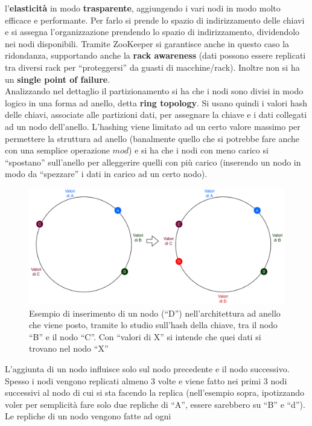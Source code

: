 \documentclass[a4paper,12pt, oneside]{book}
\begin{document}
l'\textbf{elasticità} in modo \textbf{trasparente}, aggiungendo i vari nodi in
modo molto efficace e performante. Per farlo si prende lo spazio di
indirizzamento delle chiavi e si assegna l'organizzazione prendendo lo spazio di
indirizzamento, dividendolo nei nodi disponibili. Tramite ZooKeeper si
garantisce anche in questo caso la ridondanza, supportando anche la \textbf{rack
awareness} (dati possono essere replicati tra diversi rack per ``proteggersi''
da guasti di macchine/rack). Inoltre non si ha un \textbf{single point of
  failure}.\\
Analizzando nel dettaglio il partizionamento si ha che i nodi sono divisi in
modo logico in una forma ad anello, detta \textbf{ring topology}. Si usano
quindi i valori hash delle chiavi, associate alle partizioni dati, per assegnare
la chiave e i dati collegati ad un nodo dell'anello. L'hashing viene limitato ad
un certo valore massimo per permettere la struttura ad anello (banalmente quello
che si potrebbe fare anche con una semplice operazione $mod$) e si ha che i nodi
con meno carico si ``spostano'' sull'anello per alleggerire quelli con più
carico (inserendo un nodo in modo da ``spezzare'' i dati in carico ad un certo
nodo).
\begin{figure}
  \centering
  \includegraphics[scale = 0.7]{img/cas3.pdf}
  \caption{Esempio di inserimento di un nodo (``D'') nell'architettura ad
    anello che viene posto, tramite lo studio sull'hash della chiave, tra il
    nodo ``B'' e il nodo ``C''. Con ``valori di X'' si intende che quei dati si
    trovano nel nodo ``X''}
  \label{fig:cas3}
\end{figure}
L'aggiunta di un nodo influisce solo sul nodo precedente e il nodo
successivo. Spesso i nodi vengono replicati almeno 3 volte e viene fatto nei
primi 3 nodi successivi al nodo di cui si sta facendo la replica (nell'esempio
sopra, ipotizzando voler per semplicità fare solo due repliche di ``A'', essere
sarebbero su ``B'' e ``d''). Le repliche di un nodo vengono fatte ad ogni
\end{document}
